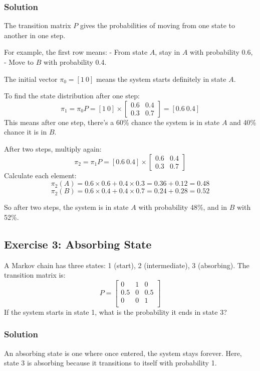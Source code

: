 \documentclass{book}
\begin{document}
\subsubsection*{Solution}
The transition matrix $P$ gives the probabilities of moving from one state to another in one step.

For example, the first row means:
- From state $A$, stay in $A$ with probability 0.6,
- Move to $B$ with probability 0.4.

The initial vector $\pi_0 = [1\ 0]$ means the system starts definitely in state $A$.

To find the state distribution after one step:
\[
\pi_1 = \pi_0 P = [1\ 0] \times \begin{bmatrix}0.6 & 0.4 \\ 0.3 & 0.7\end{bmatrix} = [0.6\ 0.4]
\]
This means after one step, there's a 60\% chance the system is in state $A$ and 40\% chance it is in $B$.

After two steps, multiply again:
\[
\pi_2 = \pi_1 P = [0.6\ 0.4] \times \begin{bmatrix}0.6 & 0.4 \\ 0.3 & 0.7\end{bmatrix}
\]
Calculate each element:
\[
\pi_2(A) = 0.6 \times 0.6 + 0.4 \times 0.3 = 0.36 + 0.12 = 0.48
\]
\[
\pi_2(B) = 0.6 \times 0.4 + 0.4 \times 0.7 = 0.24 + 0.28 = 0.52
\]

So after two steps, the system is in state $A$ with probability 48\%, and in $B$ with 52\%.

\subsection*{Exercise 3: Absorbing State}
A Markov chain has three states: 1 (start), 2 (intermediate), 3 (absorbing). The transition matrix is:
\[
P = \begin{bmatrix}
0 & 1 & 0 \\
0.5 & 0 & 0.5 \\
0 & 0 & 1 \\
\end{bmatrix}
\]
If the system starts in state 1, what is the probability it ends in state 3?

\subsubsection*{Solution}
An absorbing state is one where once entered, the system stays forever. Here, state 3 is absorbing because it transitions to itself with probability 1.
\end{document}
